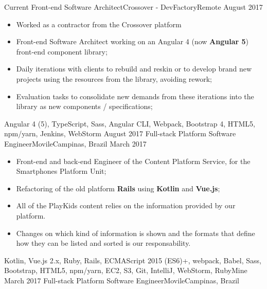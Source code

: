 %
%
%

\begin{experiences}
  \experience
    {Current}   {Front-end Software Architect}{Crossover - DevFactory}{Remote}
    {August 2017} {
    \begin{itemize}
      \item Worked as a contractor from the Crossover platform
      \item Front-end Software Architect working on an Angular 4 (now \textbf{Angular 5}) front-end component library;
      \item Daily iterations with clients to rebuild and reskin or to develop brand new projects using the resources from the library, avoiding rework;
      \item Evaluation tasks to consolidate new demands from these iterations into the library as new components / specifications;
    \end{itemize}
  }
  {Angular 4 (5), TypeScript, Sass, Angular CLI, Webpack, Bootstrap 4, HTML5, npm/yarn, Jenkins, WebStorm}
  \emptySeparator
  \experience
    {August 2017}   {Full-stack Platform Software Engineer}{Movile}{Campinas, Brazil}
    {March 2017} {
    \begin{itemize}
      \item Front-end and back-end Engineer of the Content Platform Service, for the Smartphones Platform Unit;
      \item Refactoring of the old platform \textbf{Rails} using \textbf{Kotlin} and \textbf{Vue.js};
      \item All of the PlayKids content relies on the information provided by our platform.\\
      \item Changes on which kind of information is shown and the formats that define how they can be listed and sorted is our responsability.
    \end{itemize}
  }
  {Kotlin, Vue.js 2.x, Ruby, Rails, ECMAScript 2015 (ES6)+, webpack, Babel, Sass, Bootstrap, HTML5, npm/yarn, EC2, S3, Git, IntelliJ, WebStorm, RubyMine}
  \emptySeparator
  \experience
    {March 2017}   {Full-stack Platform Software Engineer}{Movile}{Campinas, Brazil}

\end{experiences}
